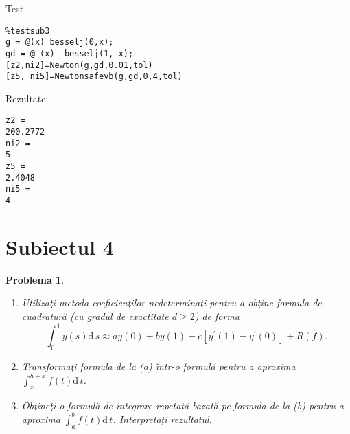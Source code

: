 \documentclass{article}%
\newtheorem{problem}[theorem]{Problema}
\begin{document}
Test
\begin{verbatim}
%testsub3
g = @(x) besselj(0,x);
gd = @ (x) -besselj(1, x);
[z2,ni2]=Newton(g,gd,0.01,tol)
[z5, ni5]=Newtonsafevb(g,gd,0,4,tol)
\end{verbatim}
Rezultate:
\begin{verbatim}
z2 =
200.2772
ni2 =
5
z5 =
2.4048
ni5 =
4
\end{verbatim}

\newpage

\section*{Subiectul 4}

\begin{problem}
\label{Gautschip3.46}

\begin{enumerate}
\item[(a)] Utiliza\c{t}i metoda coeficien\c{t}ilor nedetermina\c{t}i pentru a
ob\c{t}ine formula de cuadratur\u{a} (cu gradul de exactitate $d\geq2$) de
forma
\[
\int_{0}^{1}y(s)\mathrm{d}\,s\approx ay(0)+by(1)-c\left[  y^{\prime
}(1)-y^{\prime}(0)\right]  +R(f).
\]


\item[(b)] Transforma\c{t}i formula de la (a) \^{\i}ntr-o formul\u{a} pentru a
aproxima $\int_{x}^{h+x}f(t)\mathrm{d}\,t$.

\item[(c)] Ob\c{t}ine\c{t}i o formul\u{a} de integrare repetat\u{a} bazat\u{a}
pe formula de la (b) pentru a aproxima $\int_{a}^{b}f(t)\mathrm{d}\,t$.
Interpreta\c{t}i rezultatul.
\end{enumerate}
\end{problem}
\end{document}
